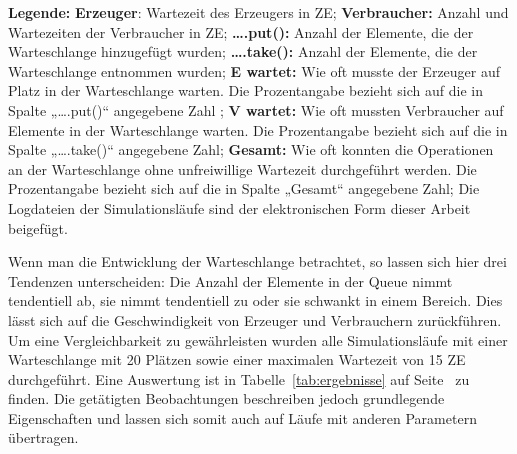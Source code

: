 \begin{landscape}
\begin{footnotesize}
\textbf{Legende:} \textbf{Erzeuger}: Wartezeit des Erzeugers in \ac{ZE}; \textbf{Verbraucher:} Anzahl und Wartezeiten der Verbraucher in \ac{ZE}; \textbf{….put():} Anzahl der Elemente, die der Warteschlange hinzugefügt wurden; \textbf{….take():} Anzahl der Elemente, die der Warteschlange entnommen wurden; \textbf{E wartet:} Wie oft musste der Erzeuger auf Platz in der Warteschlange warten. Die Prozentangabe bezieht sich auf die in Spalte „….put()“ angegebene Zahl ; \textbf{V wartet:} Wie oft mussten Verbraucher auf Elemente in der Warteschlange warten. Die Prozentangabe bezieht sich auf die in Spalte „….take()“ angegebene Zahl; \textbf{Gesamt:} Wie oft konnten die Operationen an der Warteschlange ohne unfreiwillige Wartezeit durchgeführt werden. Die Prozentangabe bezieht sich auf die in Spalte „Gesamt“ angegebene Zahl; Die Logdateien der Simulationsläufe sind der elektronischen Form dieser Arbeit beigefügt.
\end{footnotesize}
\end{landscape}

Wenn man die Entwicklung der Warteschlange betrachtet, so lassen sich hier drei Tendenzen unterscheiden: Die Anzahl der Elemente in der Queue nimmt tendentiell ab, sie nimmt tendentiell zu oder sie schwankt in einem Bereich. Dies lässt sich auf die Geschwindigkeit von Erzeuger und Verbrauchern zurückführen. Um eine Vergleichbarkeit zu gewährleisten wurden alle Simulationsläufe mit einer Warteschlange mit 20 Plätzen sowie einer maximalen Wartezeit von 15 \ac{ZE} durchgeführt. Eine Auswertung ist in Tabelle~\ref{tab:ergebnisse} auf Seite~\pageref{tab:ergebnisse} zu finden. Die getätigten Beobachtungen beschreiben jedoch grundlegende Eigenschaften und lassen sich somit auch auf Läufe mit anderen Parametern übertragen.

